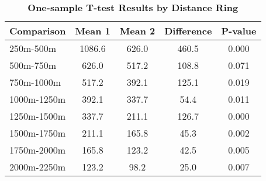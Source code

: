 \begin{table}[htbp]
\centering
\begin{tabular}{l|c c c c}
\hline
Comparison & Mean 1 & Mean 2 & Difference & P-value \\
\hline
250m-500m & 1086.6 & 626.0 & 460.5 & 0.000 \\
500m-750m & 626.0 & 517.2 & 108.8 & 0.071 \\
750m-1000m & 517.2 & 392.1 & 125.1 & 0.019 \\
1000m-1250m & 392.1 & 337.7 & 54.4 & 0.011 \\
1250m-1500m & 337.7 & 211.1 & 126.7 & 0.000 \\
1500m-1750m & 211.1 & 165.8 & 45.3 & 0.002 \\
1750m-2000m & 165.8 & 123.2 & 42.5 & 0.005 \\
2000m-2250m & 123.2 & 98.2 & 25.0 & 0.007 \\
\hline
\end{tabular}
\caption{\textbf{One-sample T-test Results by Distance Ring}}
\label{tab:ttests}
\end{table}
